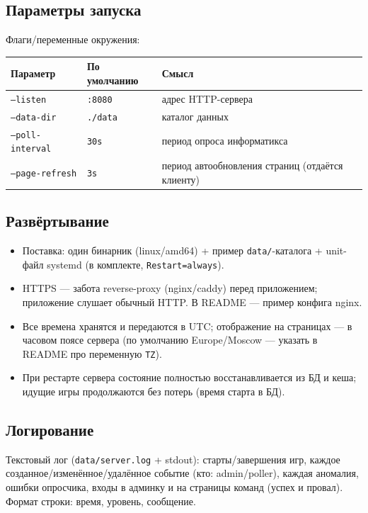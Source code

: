 \documentclass[12pt,a4paper]{article}
\newcommand{\field}[1]{\texttt{#1}}
\begin{document}
\subsection{Параметры запуска}

Флаги/переменные окружения:

\begin{longtable}{@{}p{4.6cm}p{3.4cm}p{7cm}@{}}
\toprule
\textbf{Параметр} & \textbf{По умолчанию} & \textbf{Смысл} \\
\midrule
\field{--listen} & \field{:8080} & адрес HTTP-сервера \\
\field{--data-dir} & \field{./data} & каталог данных \\
\field{--poll-interval} & \field{30s} & период опроса информатикса \\
\field{--page-refresh} & \field{3s} & период автообновления страниц (отдаётся клиенту) \\
\bottomrule
\end{longtable}

\subsection{Развёртывание}

\begin{itemize}[nosep]
  \item Поставка: один бинарник (linux/amd64) + пример
        \field{data/}-каталога + unit-файл systemd (в комплекте,
        \field{Restart=always}).
  \item HTTPS --- забота reverse-proxy (nginx/caddy) перед приложением;
        приложение слушает обычный HTTP. В README --- пример конфига nginx.
  \item Все времена хранятся и передаются в UTC; отображение на страницах ---
        в часовом поясе сервера (по умолчанию Europe/Moscow --- указать в
        README про переменную \field{TZ}).
  \item При рестарте сервера состояние полностью восстанавливается из БД и
        кеша; идущие игры продолжаются без потерь (время старта в БД).
\end{itemize}

\subsection{Логирование}

Текстовый лог (\field{data/server.log} + stdout): старты/завершения игр,
каждое созданное/изменённое/удалённое событие (кто: admin/poller), каждая
аномалия, ошибки опросчика, входы в админку и на страницы команд (успех и
провал). Формат строки: время, уровень, сообщение.
\end{document}
